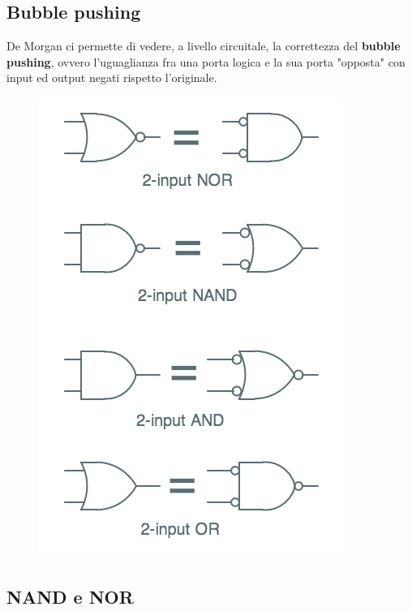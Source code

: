 \documentclass{report}
\begin{document}
    \subsection{Bubble pushing}
        De Morgan ci permette di vedere, a livello circuitale, la correttezza 
        del \textbf{bubble pushing}, ovvero l'uguaglianza fra una porta logica e 
        la sua porta "opposta" con input ed output negati rispetto l'originale.
        \begin{center}
            \begin{figure}[H]
                \includegraphics[width=\textwidth]{bubblepushing.png}
            \end{figure}
        \end{center}  
    \subsection{NAND e NOR}
\end{document}
